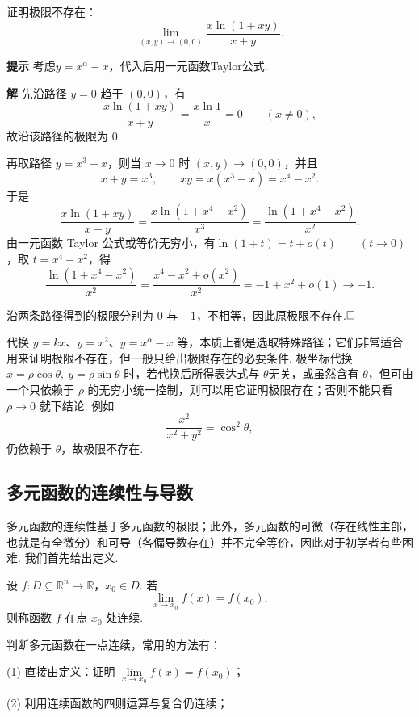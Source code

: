 \documentclass{ctexart}
\newenvironment{custom}[1]{\par\noindent \textbf{#1}\quad}{\par\vspace{1em}}
\begin{document}
\begin{exercise}
证明极限不存在：
$$\lim\limits_{(x,y)\to(0,0)}{\frac{x\ln(1+xy)}{x+y}}.$$
\end{exercise}

\begin{custom}{提示}
考虑$y=x^{\alpha}-x$，代入后用一元函数Taylor公式.
\end{custom}

\begin{custom}{解}
先沿路径 $y=0$ 趋于 $(0,0)$，有
$$\frac{x\ln(1+xy)}{x+y}
=\frac{x\ln 1}{x}=0\qquad (x\neq 0),$$
故沿该路径的极限为 $0$.

再取路径 $y=x^3-x$，则当 $x\to 0$ 时 $(x,y)\to(0,0)$，并且
$$x+y=x^3,\qquad xy=x(x^3-x)=x^4-x^2.$$
于是
$$\frac{x\ln(1+xy)}{x+y}
=\frac{x\ln(1+x^4-x^2)}{x^3}
=\frac{\ln(1+x^4-x^2)}{x^2}.$$
由一元函数 Taylor 公式或等价无穷小，有$\ln(1+t)=t+o(t)\qquad (t\to 0)$，取 $t=x^4-x^2$，得
$$\frac{\ln(1+x^4-x^2)}{x^2}
=\frac{x^4-x^2+o(x^2)}{x^2}
=-1+x^2+o(1)\to -1.$$

沿两条路径得到的极限分别为 $0$ 与 $-1$，不相等，因此原极限不存在.$\hfill{\square}$
\end{custom}


代换 $y=kx$、$y=x^2$、$y=x^\alpha-x$ 等，本质上都是选取特殊路径；它们非常适合
用来证明极限不存在，但一般只给出极限存在的必要条件. 极坐标代换 $x=\rho\cos\theta,\ y=\rho\sin\theta$ 时，若代换后所得表达式与 $\theta$无关，或虽然含有 $\theta$，但可由一个只依赖于 $\rho$ 的无穷小统一控制，则可以用它证明极限存在；否则不能只看 $\rho\to 0$ 就下结论. 例如
$$\frac{x^2}{x^2+y^2}=\cos^2\theta,$$
仍依赖于 $\theta$，故极限不存在.

\clearpage
\subsection{多元函数的连续性与导数}
多元函数的连续性基于多元函数的极限；此外，多元函数的可微（存在线性主部，也就是有全微分）和可导（各偏导数存在）并不完全等价，因此对于初学者有些困难. 我们首先给出定义.
\begin{definition}[多元函数的连续]
设 $f:D\subseteq\mathbb{R}^n\to\mathbb{R}$，$x_0\in D$.
若
$$\lim\limits_{x\to x_0}f(x)=f(x_0),$$
则称函数 $f$ 在点 $x_0$ 处连续.
\end{definition}

判断多元函数在一点连续，常用的方法有：

(1) 直接由定义：证明 $\lim\limits_{x\to x_0}f(x)=f(x_0)$；

(2) 利用连续函数的四则运算与复合仍连续；
\end{document}
